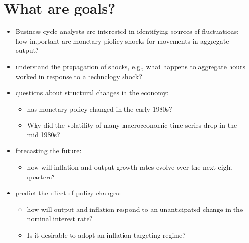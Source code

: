 \documentclass[]{scrartcl}
\begin{document}
\section{What are goals?}
\begin{itemize}
	\item Business cycle analysts are interested in identifying sources of fluctuations: how important are monetary piolicy shocks for movements in aggregate output? 
	\item understand the propagation of	shocks, e.g., what happens to aggregate hours worked in response to a technology shock? 
	\item questions about structural changes in the economy: 
	\begin{itemize}
		\item has monetary policy changed in the early 1980s? 
		\item Why did the volatility of many macroeconomic time series drop in the mid 1980s? 
	\end{itemize}
	\item forecasting the future: 
	\begin{itemize}
		\item how will inflation and output growth rates evolve over the next eight quarters? 
	\end{itemize}
	\item predict the effect of policy changes: 
	\begin{itemize}
		\item how will output and inflation respond to an unanticipated change in the nominal interest rate? 
		\item Is it desirable to adopt an inflation targeting regime?
	\end{itemize}


\end{itemize}
\end{document}
